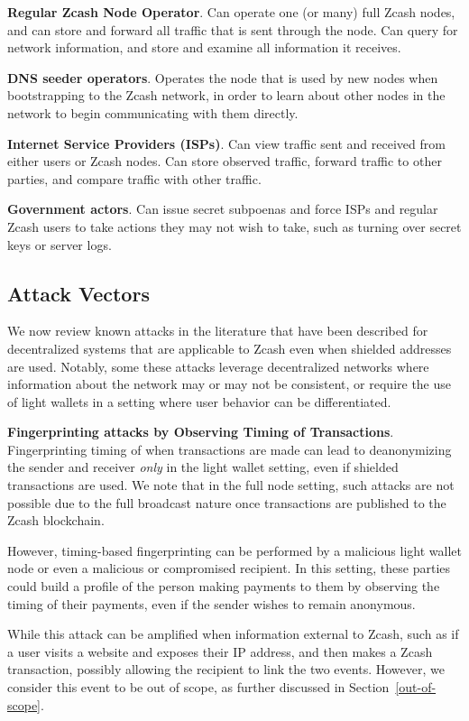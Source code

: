 \documentclass{article}
\begin{document}
\textbf{Regular Zcash Node Operator}. Can operate one (or many) full Zcash
nodes, and can store and forward all traffic that is sent through the node. Can
query for network information, and store and examine all information it
receives.

\textbf{DNS seeder operators}. Operates the node that is used by new nodes when
bootstrapping to the Zcash network, in order to learn about other nodes in the
network to begin communicating with them directly.

\textbf{Internet Service Providers (ISPs)}. Can view traffic sent and received
from either users or Zcash nodes. Can store observed traffic, forward traffic
to other parties, and compare traffic with other traffic.

\textbf{Government actors}. Can issue secret subpoenas and force ISPs and
regular Zcash users to take actions they may not wish to take, such as turning
over secret keys or server logs.

\subsection{Attack Vectors}
\label{attack-vectors}

We now review known attacks in the literature that have been described for
decentralized systems that are applicable to Zcash even when shielded addresses
are used. Notably, some these attacks leverage
decentralized networks where information about the network may or may not be
consistent, or require the use of light wallets in a setting where user
behavior can be differentiated.

\textbf{Fingerprinting attacks by Observing Timing of Transactions}.
Fingerprinting timing of when transactions are made
can lead to deanonymizing the sender and
receiver \emph{only} in the light wallet setting, even if shielded transactions
are used. We note that in the full node setting, such attacks are not possible
due to the full broadcast nature once transactions are published to the Zcash
blockchain.

However, timing-based fingerprinting can be performed by a
malicious light wallet node or even a malicious or compromised recipient. In
this setting, these parties could build a profile of the person making payments
to them by observing the timing of their payments, even if the sender wishes to remain
anonymous.

While this attack can be amplified when information external to Zcash, such as
if a user visits a website and exposes their IP address, and then makes a Zcash
transaction, possibly allowing the recipient to link the two events. However,
we consider this event to be out of scope, as further discussed in
Section~\ref{out-of-scope}.
\end{document}
